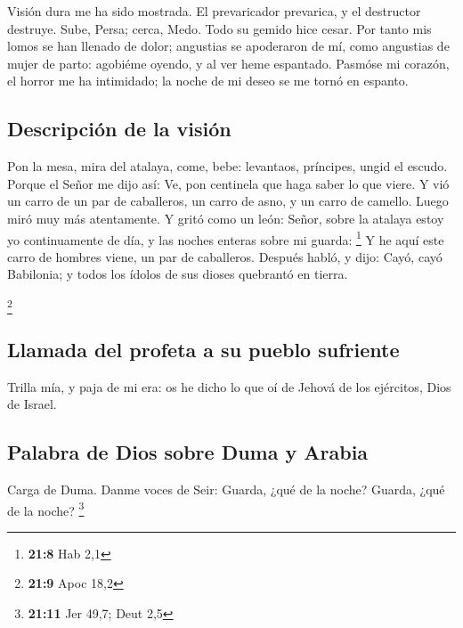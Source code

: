  Visión dura me ha sido mostrada. El prevaricador
prevarica, y el destructor destruye. Sube, Persa; cerca, Medo. Todo su
gemido hice cesar.  Por tanto mis lomos se han llenado de
dolor; angustias se apoderaron de mí, como angustias de mujer de parto:
agobiéme oyendo, y al ver heme espantado.  Pasmóse mi
corazón, el horror me ha intimidado; la noche de mi deseo se me tornó en
espanto.

\hypertarget{descripciuxf3n-de-la-visiuxf3n}{%
\subsection{Descripción de la
visión}\label{descripciuxf3n-de-la-visiuxf3n}}

 Pon la mesa, mira del atalaya, come, bebe: levantaos,
príncipes, ungid el escudo.  Porque el Señor me dijo así:
Ve, pon centinela que haga saber lo que viere.  Y vió un
carro de un par de caballeros, un carro de asno, y un carro de camello.
Luego miró muy más atentamente.  Y gritó como un león:
Señor, sobre la atalaya estoy yo continuamente de día, y las noches
enteras sobre mi guarda: \footnote{\textbf{21:8} Hab 2,1} 
Y he aquí este carro de hombres viene, un par de caballeros. Después
habló, y dijo: Cayó, cayó Babilonia; y todos los ídolos de sus dioses
quebrantó en tierra.

\footnote{\textbf{21:9} Apoc 18,2}

\hypertarget{llamada-del-profeta-a-su-pueblo-sufriente}{%
\subsection{Llamada del profeta a su pueblo
sufriente}\label{llamada-del-profeta-a-su-pueblo-sufriente}}

 Trilla mía, y paja de mi era: os he dicho lo que oí de
Jehová de los ejércitos, Dios de Israel.

\hypertarget{palabra-de-dios-sobre-duma-y-arabia}{%
\subsection{Palabra de Dios sobre Duma y
Arabia}\label{palabra-de-dios-sobre-duma-y-arabia}}

 Carga de Duma. Danme voces de Seir: Guarda, ¿qué de la
noche? Guarda, ¿qué de la noche? \footnote{\textbf{21:11} Jer 49,7; Deut
  2,5}


